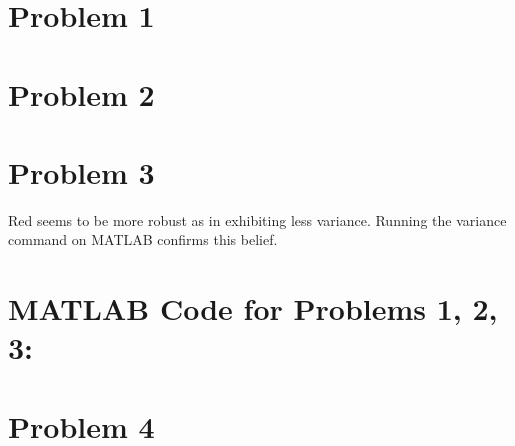 \documentclass[12pt]{article}
\begin{document}
	
	 

\section*{Problem 1}
		\begin{center}
		\end{center}
\vspace*{-2cm}
\section*{Problem 2}
		\begin{center}
		\end{center}
	
\section*{Problem 3}
		\begin{center}
		\end{center}
	Red seems to be more robust as in exhibiting less variance. Running the variance command on MATLAB confirms this belief.
\section*{MATLAB Code for Problems 1, 2, 3:}
	
	
	
\section*{Problem 4}
   
\end{document}
